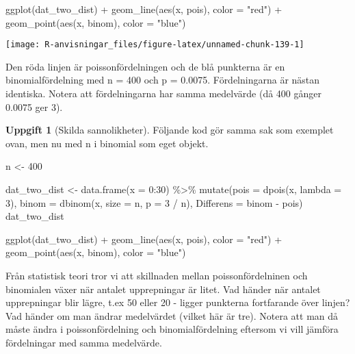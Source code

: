 \documentclass[
]{book}
\newenvironment{Shaded}{\begin{snugshade}}{\end{snugshade}}
\newcommand{\AttributeTok}[1]{\textcolor[rgb]{0.77,0.63,0.00}{#1}}
\newcommand{\DecValTok}[1]{\textcolor[rgb]{0.00,0.00,0.81}{#1}}
\newcommand{\FunctionTok}[1]{\textcolor[rgb]{0.00,0.00,0.00}{#1}}
\newcommand{\NormalTok}[1]{#1}
\newcommand{\OtherTok}[1]{\textcolor[rgb]{0.56,0.35,0.01}{#1}}
\newcommand{\SpecialCharTok}[1]{\textcolor[rgb]{0.00,0.00,0.00}{#1}}
\newcommand{\StringTok}[1]{\textcolor[rgb]{0.31,0.60,0.02}{#1}}
\theoremstyle{definition}
\theoremstyle{definition}
\theoremstyle{definition}
\newtheorem{exercise}{Uppgift}[chapter]
\theoremstyle{definition}
\theoremstyle{remark}
\begin{document}
\begin{Shaded}
\begin{Highlighting}[]
\FunctionTok{ggplot}\NormalTok{(dat\_two\_dist) }\SpecialCharTok{+}
  \FunctionTok{geom\_line}\NormalTok{(}\FunctionTok{aes}\NormalTok{(x, pois), }\AttributeTok{color =} \StringTok{"red"}\NormalTok{) }\SpecialCharTok{+}
  \FunctionTok{geom\_point}\NormalTok{(}\FunctionTok{aes}\NormalTok{(x, binom), }\AttributeTok{color =} \StringTok{"blue"}\NormalTok{)}
\end{Highlighting}
\end{Shaded}

\begin{center}\texttt{[image: R-anvisningar\_files/figure-latex/unnamed-chunk-139-1]} \end{center}

Den röda linjen är poissonfördelningen och de blå punkterna är en binomialfördelning med n = 400 och p = 0.0075. Fördelningarna är nästan identiska. Notera att fördelningarna har samma medelvärde (då 400 gånger 0.0075 ger 3).

\begin{exercise}[Skilda sannolikheter]
Följande kod gör samma sak som exemplet ovan, men nu med n i binomial som eget objekt.

\begin{Shaded}
\begin{Highlighting}[]
\NormalTok{n }\OtherTok{\textless{}{-}} \DecValTok{400}

\NormalTok{dat\_two\_dist }\OtherTok{\textless{}{-}} \FunctionTok{data.frame}\NormalTok{(}\AttributeTok{x =} \DecValTok{0}\SpecialCharTok{:}\DecValTok{30}\NormalTok{) }\SpecialCharTok{\%\textgreater{}\%} 
  \FunctionTok{mutate}\NormalTok{(}\AttributeTok{pois =} \FunctionTok{dpois}\NormalTok{(x, }\AttributeTok{lambda =} \DecValTok{3}\NormalTok{),}
         \AttributeTok{binom =} \FunctionTok{dbinom}\NormalTok{(x, }\AttributeTok{size =}\NormalTok{ n, }\AttributeTok{p =} \DecValTok{3} \SpecialCharTok{/}\NormalTok{ n),}
         \AttributeTok{Differens =}\NormalTok{ binom }\SpecialCharTok{{-}}\NormalTok{ pois)}
\NormalTok{dat\_two\_dist}

\FunctionTok{ggplot}\NormalTok{(dat\_two\_dist) }\SpecialCharTok{+}
  \FunctionTok{geom\_line}\NormalTok{(}\FunctionTok{aes}\NormalTok{(x, pois), }\AttributeTok{color =} \StringTok{"red"}\NormalTok{) }\SpecialCharTok{+}
  \FunctionTok{geom\_point}\NormalTok{(}\FunctionTok{aes}\NormalTok{(x, binom), }\AttributeTok{color =} \StringTok{"blue"}\NormalTok{)}
\end{Highlighting}
\end{Shaded}

Från statistisk teori tror vi att skillnaden mellan poissonfördelninen och binomialen växer när antalet upprepningar är litet. Vad händer när antalet upprepningar blir lägre, t.ex 50 eller 20 - ligger punkterna fortfarande över linjen? Vad händer om man ändrar medelvärdet (vilket här är tre). Notera att man då måste ändra i poissonfördelning och binomialfördelning eftersom vi vill jämföra fördelningar med samma medelvärde.
\end{exercise}
\end{document}
